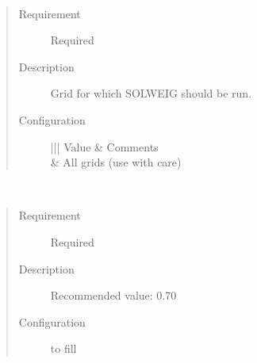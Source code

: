 \documentclass[letterpaper,10pt,english]{sphinxmanual}
\begin{document}
\begin{fulllineitems}
\label{\detokenize{input_files/SOLWEIG_input/SOLWEIGinput:cmdoption-arg-runforgrid}}~\begin{quote}\begin{description}
\item[{Requirement}] \leavevmode
Required

\item[{Description}] \leavevmode
Grid for which SOLWEIG should be run.

\item[{Configuration}] \leavevmode

\begin{savenotes}\sphinxattablestart
\centering
\begin{tabular}[t]{|||}
\hline
\sphinxstyletheadfamily 
Value
&\sphinxstyletheadfamily 
Comments
\\
&
All grids (use with care)
\\
\hline
\end{tabular}
\par
\sphinxattableend\end{savenotes}

\end{description}\end{quote}

\end{fulllineitems}


\begin{fulllineitems}
\label{\detokenize{input_files/SOLWEIG_input/SOLWEIGinput:cmdoption-arg-absk}}~\begin{quote}\begin{description}
\item[{Requirement}] \leavevmode
Required

\item[{Description}] \leavevmode
Recommended value: 0.70

\item[{Configuration}] \leavevmode
to fill

\end{description}\end{quote}

\end{fulllineitems}
\end{document}
